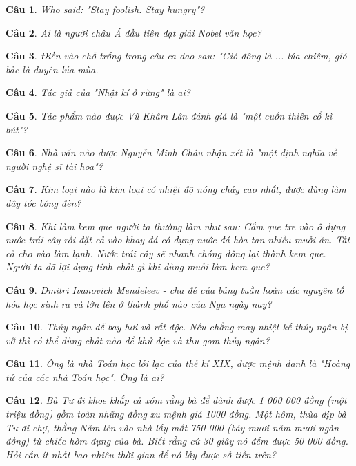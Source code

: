 \documentclass[12pt,a4paper]{article}
\newtheorem{ques}{Câu}
\theoremstyle{nonumberplain}
\begin{document}
\begin{ques}
Who said: \textit{"Stay foolish. Stay hungry"}?
\end{ques}
\begin{ques}
Ai là người châu Á đầu tiên đạt giải Nobel văn học?
\end{ques}
\begin{ques}
Điền vào chỗ trống trong câu ca dao sau: \textit{"Gió đông là ... lúa chiêm, gió bấc là duyên lúa mùa.}
\end{ques}
\begin{ques}
Tác giả của \textit{"Nhật kí ở rừng"} là ai?
\end{ques}
\begin{ques}
Tác phẩm nào được Vũ Khâm Lân đánh giá là \textit{"một cuốn thiên cổ kì bút"}?
\end{ques}
\begin{ques}
Nhà văn nào được Nguyễn Minh Châu nhận xét là \textit{"một định nghĩa về người nghệ sĩ tài hoa"}?
\end{ques}
\begin{ques}
Kim loại nào là kim loại có nhiệt độ nóng chảy cao nhất, được dùng làm dây tóc bóng đèn?
\end{ques}
\begin{ques}
Khi làm kem que người ta thường làm như sau: Cắm que tre vào ô đựng nước trái cây rồi đặt cả vào khay đá có đựng nước đá hòa tan nhiều muối ăn. Tất cả cho vào làm lạnh. Nước trái cây sẽ nhanh chóng đông lại thành kem que. Người ta đã lợi dụng tính chất gì khi dùng muối làm kem que?
\end{ques}
\begin{ques}
Dmitri Ivanovich Mendeleev - cha đẻ của bảng tuần hoàn các nguyên tố hóa học sinh ra và lớn lên ở thành phố nào của Nga ngày nay?
\end{ques}
\begin{ques}
Thủy ngân dễ bay hơi và rất độc. Nếu chẳng may nhiệt kế thủy ngân bị vỡ thì có thể dùng chất nào để khử độc và thu gom thủy ngân?
\end{ques}
\begin{ques}
Ông là nhà Toán học lỗi lạc của thế kỉ XIX, được mệnh danh là \textit{"Hoàng tử của các nhà Toán học"}. Ông là ai?
\end{ques}
\begin{ques}
Bà Tư đi khoe khắp cả xóm rằng bà để dành được 1 000 000 đồng (một triệu đồng) gồm toàn những đồng xu mệnh giá 1000 đồng. Một hôm, thừa dịp bà Tư đi chợ, thằng Năm lẻn vào nhà lấy mất 750 000 (bảy mươi năm mươi ngàn đồng) từ chiếc hòm đựng của bà. Biết rằng cứ 30 giây nó đếm được 50 000 đồng. Hỏi cần ít nhất bao nhiêu thời gian để nó lấy được số tiền trên?
\end{ques}
\end{document}
